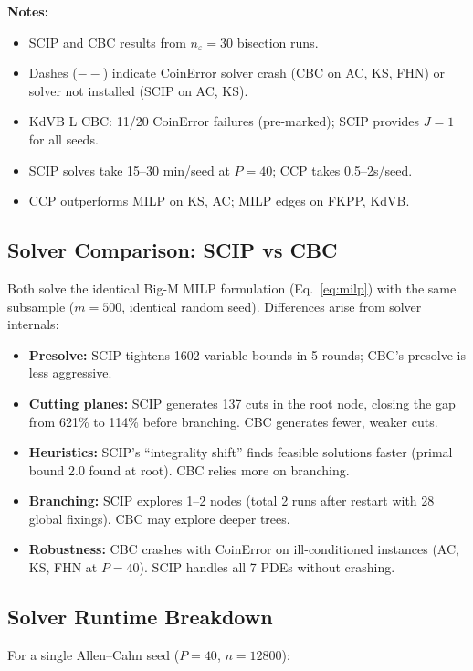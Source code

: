 \documentclass[11pt]{article}
\begin{document}
\textbf{Notes:}
\begin{itemize}
  \item SCIP and CBC results from $n_{\varepsilon}=30$ bisection runs.
  \item Dashes ($--$) indicate CoinError solver crash (CBC on AC, KS, FHN)
    or solver not installed (SCIP on AC, KS).
  \item KdVB L CBC: 11/20 CoinError failures (pre-marked); SCIP provides
    $J=1$ for all seeds.
  \item SCIP solves take 15--30 min/seed at $P=40$; CCP takes 0.5--2s/seed.
  \item CCP outperforms MILP on KS, AC; MILP edges on FKPP, KdVB.
\end{itemize}

\subsection{Solver Comparison: SCIP vs CBC}

Both solve the identical Big-M MILP formulation (Eq.~\ref{eq:milp}) with
the same subsample ($m=500$, identical random seed). Differences arise from
solver internals:

\begin{itemize}
  \item \textbf{Presolve:} SCIP tightens 1602 variable bounds in 5 rounds;
    CBC's presolve is less aggressive.
  \item \textbf{Cutting planes:} SCIP generates 137 cuts in the root node,
    closing the gap from 621\% to 114\% before branching. CBC generates fewer,
    weaker cuts.
  \item \textbf{Heuristics:} SCIP's ``integrality shift'' finds feasible
    solutions faster (primal bound 2.0 found at root). CBC relies more
    on branching.
  \item \textbf{Branching:} SCIP explores 1--2 nodes (total 2 runs after
    restart with 28 global fixings). CBC may explore deeper trees.
  \item \textbf{Robustness:} CBC crashes with CoinError on ill-conditioned
    instances (AC, KS, FHN at $P=40$). SCIP handles all 7 PDEs without
    crashing.
\end{itemize}

\subsection{Solver Runtime Breakdown}

For a single Allen--Cahn seed ($P=40$, $n=12800$):
\end{document}
